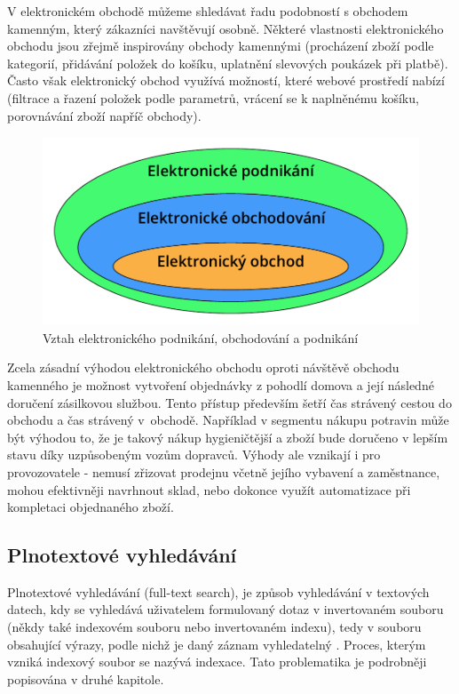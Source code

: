 \documentclass[FM,DP]{tulthesis}
\begin{document}
V elektronickém obchodě můžeme shledávat řadu podobností s obchodem kamenným, který zákazníci 
navštěvují osobně. Některé vlastnosti elektronického obchodu jsou zřejmě inspirovány 
obchody kamennými (procházení zboží podle kategorií, přidávání položek do košíku, 
uplatnění slevových poukázek při platbě). Často však elektronický obchod využívá možností, 
které webové prostředí nabízí (filtrace a řazení položek podle parametrů, vrácení se
k naplněnému košíku, porovnávání zboží napříč obchody).

\begin{figure}[h]
\center
\includegraphics[width=\textwidth]{e-commerce.pdf}
\caption{Vztah elektronického podnikání, obchodování a podnikání}
\label{foto}
\end{figure}

Zcela zásadní výhodou elektronického obchodu oproti návštěvě obchodu kamenného
je možnost vytvoření objednávky z pohodlí domova a její následné doručení zásilkovou 
službou. Tento přístup především šetří čas strávený cestou do obchodu a čas strávený 
v~obchodě. Například v segmentu nákupu potravin může být výhodou to, že je takový 
nákup hygieničtější a zboží bude doručeno v lepším stavu díky uzpůsobeným vozům dopravců.
Výhody ale vznikají i pro provozovatele - nemusí zřizovat prodejnu včetně jejího vybavení a 
zaměstnance, mohou efektivněji navrhnout sklad, nebo dokonce využít automatizace 
při kompletaci objednaného zboží.

\subsection*{Plnotextové vyhledávání}

Plnotextové vyhledávání (full-text search), je způsob vyhledávání v textových datech, 
kdy se vyhledává uživatelem formulovaný dotaz v invertovaném souboru (někdy také 
indexovém souboru nebo invertovaném indexu), tedy v souboru obsahující výrazy, 
podle nichž je daný záznam vyhledatelný \cite[strana~15]{strossa}. 
Proces, kterým vzniká indexový soubor se nazývá indexace. Tato problematika je podrobněji
popisována v druhé kapitole.
\end{document}
